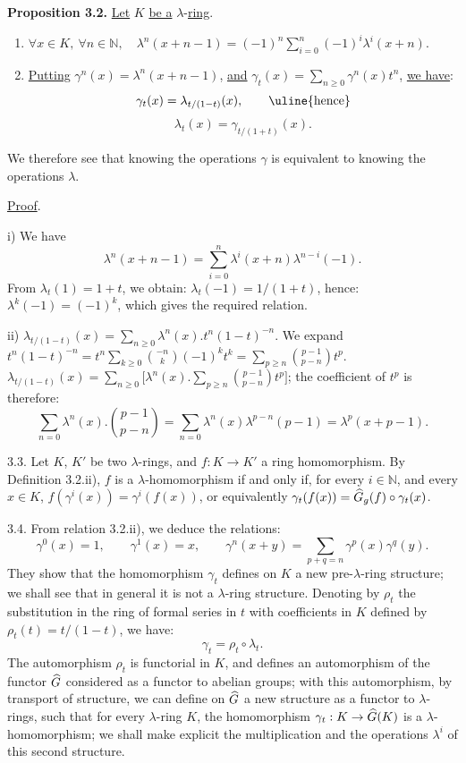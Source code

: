 \textbf{Proposition 3.2.} \uline{Let} \(K\) \uline{be a} \(\lambda\)-\uline{ring}.
\begin{enumerate}[label=\roman*)]
\item \(\forall x\in K,\ \forall n\in\mathbb N,\quad \lambda^n(x+n-1)=(-1)^n\sum_{i=0}^n(-1)^i\lambda^i(x+n).\)
\item \uline{Putting} \(\gamma^n(x)=\lambda^n(x+n-1)\), \uline{and} \(\gamma_t(x)=\sum_{n\ge0}\gamma^n(x)t^n\), \uline{we have}:
\[
  \gamma_t(x)=\lambda_{t/(1-t)}(x),\qquad\text{\uline{hence}}
\]
\[
  \lambda_t(x)=\gamma_{t/(1+t)}(x).
\]
\end{enumerate}

We therefore see that knowing the operations \(\gamma\) is equivalent to knowing the operations \(\lambda\).

\uline{Proof}.

i) We have
\[
  \lambda^n(x+n-1)=\sum_{i=0}^{n}\lambda^i(x+n)\lambda^{n-i}(-1).
\]
From \(\lambda_t(1)=1+t\), we obtain: \(\lambda_t(-1)=1/(1+t)\), hence: \(\lambda^k(-1)=(-1)^k\), which gives the required relation.

ii) \(\lambda_{t/(1-t)}(x)=\sum_{n\ge0}\lambda^n(x).t^n(1-t)^{-n}.\)
We expand \(t^n(1-t)^{-n}=t^n\sum_{k\ge0}\binom{-n}{k}(-1)^kt^k=\sum_{p\ge n}\binom{p-1}{p-n}t^p\). \(\lambda_{t/(1-t)}(x)=\sum_{n\ge0}\bigl[\lambda^n(x).\sum_{p\ge n}\binom{p-1}{p-n}t^p\bigr]\); the coefficient of \(t^p\) is therefore:
\[
  \sum_{n=0}\lambda^n(x).\binom{p-1}{p-n}
  =\sum_{n=0}\lambda^n(x)\lambda^{p-n}(p-1)
  =\lambda^p(x+p-1).
\]

%
3.3.
Let \(K\), \(K'\) be two \(\lambda\)-rings, and \(f:K\to K'\) a ring homomorphism. By Definition 3.2.ii), \(f\) is a \(\lambda\)-homomorphism if and only if, for every \(i\in\mathbb N\), and every \(x\in K\), \(f(\gamma^i(x))=\gamma^i(f(x))\), or equivalently \(\gamma_t(f(x))=\widehat G_g(f)\circ\gamma_t(x)\).

3.4. From relation 3.2.ii), we deduce the relations:
\begin{equation}\tag{3.4.1}
  \gamma^0(x)=1,
  \qquad \gamma^1(x)=x,
  \qquad \gamma^n(x+y)=\sum_{p+q=n}\gamma^p(x)\gamma^q(y).
\end{equation}
They show that the homomorphism \(\gamma_t\) defines on \(K\) a new pre-\(\lambda\)-ring structure; we shall see that in general it is not a \(\lambda\)-ring structure. Denoting by \(\rho_t\) the substitution in the ring of formal series in \(t\) with coefficients in \(K\) defined by \(\rho_t(t)=t/(1-t)\), we have:
\[
  \gamma_t=\rho_t\circ\lambda_t.
\]
The automorphism \(\rho_t\) is functorial in \(K\), and defines an automorphism of the functor \(\widehat G\) considered as a functor to abelian groups; with this automorphism, by transport of structure, we can define on \(\widehat G\) a new structure as a functor to \(\lambda\)-rings, such that for every \(\lambda\)-ring \(K\), the homomorphism \(\gamma_t:K\to\widehat G(K)\) is a \(\lambda\)-homomorphism; we shall make explicit the multiplication and the operations \(\lambda^i\) of this second structure.

